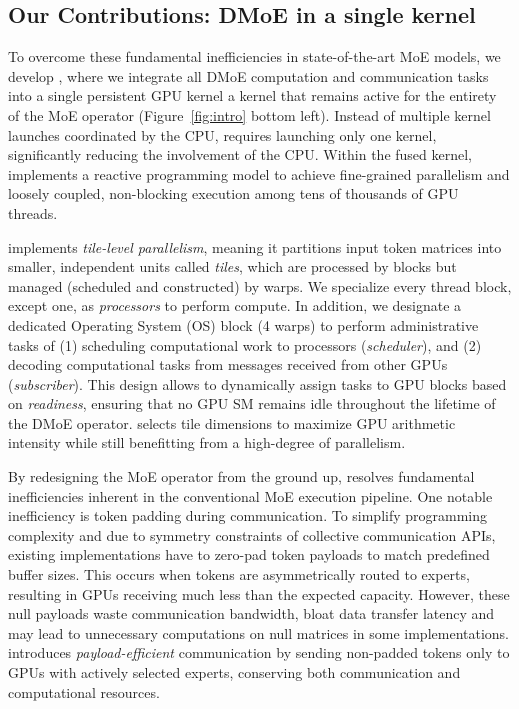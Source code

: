 \subsection{Our Contributions: DMoE in a single kernel}
To overcome these fundamental inefficiencies in state-of-the-art MoE models, we develop \sysname, where we
integrate all DMoE computation and communication tasks into a single persistent GPU kernel
\ie a kernel that remains active for the entirety of the MoE operator (Figure~\ref{fig:intro} bottom left).
Instead of multiple kernel launches coordinated by the CPU, \sysname requires launching only one kernel,
significantly reducing the involvement of the CPU\@.
Within the fused kernel, \sysname implements a reactive programming model to achieve
fine-grained parallelism and loosely coupled, non-blocking execution among tens of thousands of GPU threads.

\sysname implements \emph{tile-level parallelism},
meaning it partitions input token matrices into smaller, independent units called \emph{tiles},
which are processed by blocks but managed (scheduled and constructed) by warps.
We specialize every thread block, except one, as \emph{processors} to perform compute.
In addition, we designate a dedicated Operating System (OS) block (4 warps) to perform administrative tasks of
(1) scheduling computational work to processors (\emph{scheduler}),
and (2) decoding computational tasks from messages received from other GPUs (\emph{subscriber}).
This design allows \sysname to dynamically assign tasks to GPU blocks based on \emph{readiness},
ensuring that no GPU SM remains idle throughout the lifetime of the DMoE operator.
\sysname selects tile dimensions to maximize GPU arithmetic intensity
while still benefitting from a high-degree of parallelism.

By redesigning the MoE operator from the ground up,
\sysname resolves fundamental inefficiencies inherent in the conventional MoE execution pipeline.
One notable inefficiency is token padding during communication.
To simplify programming complexity and due to symmetry constraints of collective communication APIs,
existing implementations have to zero-pad token payloads to match predefined buffer sizes.
This occurs when tokens are asymmetrically routed to experts, resulting in GPUs receiving much less than the expected
capacity.
However, these null payloads waste communication bandwidth, bloat data transfer latency and may lead to
unnecessary computations on null matrices in some implementations.
\sysname introduces \emph{payload-efficient} communication by sending non-padded tokens only to
GPUs with actively selected experts, conserving both communication and computational resources.

